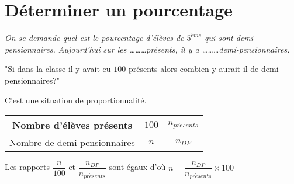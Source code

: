 \section{Déterminer un pourcentage}
\begin{exemple*1}
   \textit{On se demande quel est le pourcentage d'élèves de $5^{\grave{e}me}$ qui sont demi-pensionnaires. Aujourd'hui sur les \ldots \ldots \ldots présents, il y a \ldots \ldots \ldots demi-pensionnaires.}

   "Si dans la classe il y avait eu $100$ présents alors combien y aurait-il de demi-pensionnaires?"

   C'est une situation de proportionnalité.

   \begin{center}
      \begin{tabular}{|c|c|c|}
         \hline
         Nombre d'élèves présents&$100$&$n_{pr\acute{e}sents}$\\
         \hline
         Nombre de demi-pensionnaires&$n$&$n_{DP}$\\
         \hline
      \end{tabular}
   \end{center}

   Les rapports $\dfrac{n}{100}$ et $\dfrac{n_{DP}}{n_{pr\acute{e}sents}}$ sont égaux d'où
   $n=\dfrac{n_{DP}}{n_{pr\acute{e}sents}}\times 100$
\end{exemple*1}
